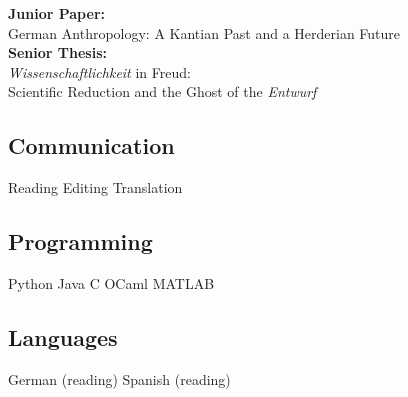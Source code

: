 \documentclass[a4paper]{MagicalCV}
\begin{document}
\begin{minipage}[t]{0.33\textwidth}
\textbf{Junior Paper:} \\
German Anthropology: A Kantian Past and a Herderian Future \\

\textbf{Senior Thesis:} \\
\textit{Wissenschaftlichkeit} in Freud: \\
Scientific Reduction and the Ghost of the \textit{Entwurf}
\sectionsep


\subsection{Communication}
Reading \textbullet{} Editing \textbullet{} Translation\\
\sectionsep

\subsection{Programming}
Python \textbullet{} Java \textbullet{} C \textbullet{} OCaml \textbullet{} MATLAB
\sectionsep


\subsection{Languages}
German (reading) \textbullet{} Spanish (reading)
\sectionsep

\end{minipage} 
\hfill
\end{document}
